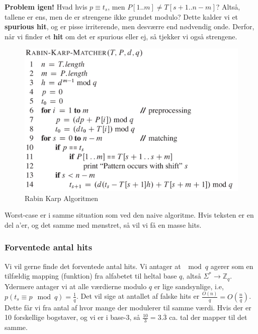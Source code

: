 \documentclass[11pt]{article}
\theoremstyle{definition}
\theoremstyle{remark}
\begin{document}
\textbf{Problem igen!} Hvad hvis $p \equiv t_{s}$, men $P[1..m] \neq T[s+1..n-m]$? Altså, tallene er ens, men de er strengene ikke grundet modulo? Dette kalder vi et \textbf{spurious hit}, og er pisse irriterende, men desværre end nødvendig onde. Derfor, når vi finder et \textbf{hit} om det er spurious eller ej, så tjekker vi også strengene. 

\begin{figure}[ht]
  \centering
  \includegraphics[width=400pt]{main--string-matching--rabin-karp-9fe7.png}
  \caption{\label{fig:rabinkarpalgorithm} Rabin Karp Algoritmen}
\end{figure}


Worst-case er i samme situation som ved den naive algoritme. Hvis teksten er en del a'er, og det samme med mønstret, så vil vi få en masse hits.



\subsubsection{Forventede antal hits}

Vi vil gerne finde det forventede antal hits. Vi antager at $\mod q$ agerer som en tilfældig mapping (funktion) fra alfabetet til heltal base $q$, altså $\Sigma^{*} \rightarrow \mathbb{Z}_{q}$. Ydermere antager vi at alle værdierne modulo $q$ er lige sandsynlige, i.e, $p(t_{s} \equiv p \mod q) = \frac{1}{q}$. Det vil sige at antallet af falske hits er $\frac{O(n)}{q} = O(\frac{n}{q}) $. Dette får vi fra antal af hvor mange der modulerer til samme værdi. Hvis der er 10 forskellige bogstaver, og vi er i base-3, så $\frac{10}{3} = 3.\overline{3}$ ca. tal der mapper til det samme.
\end{document}
